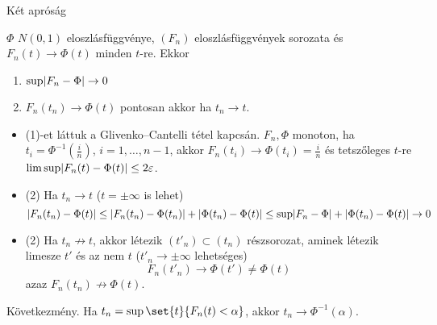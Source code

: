 \documentclass[aspectratio=169,notheorems,9pt,\option]{beamer}
\begin{document}
  \begin{frame}{Két apróság}
    \begin{proposition}
      $\Phi$ $N (0,1)$ eloszlásfüggvénye, $(F_n)$ eloszlásfüggvények
      sorozata és  $F_n (t)\to \Phi (t)$ minden $t$-re.  Ekkor
      \begin{enumerate}
      \item $\sup\abs*{F_n-\Phi}\to0$ 
      \item $F_n (t_n)\to \Phi (t)$ pontosan akkor ha $t_n\to t$.
      \end{enumerate}
    \end{proposition}
    \begin{itemize}
    \item (1)-et láttuk a  Glivenko--Cantelli
      tétel kapcsán. $F_n,\Phi$ monoton, ha $t_i=\Phi^{-1}(\frac in)$, $i=1,\dots,n-1$, akkor
      $F_n(t_i)\to\Phi(t_i)=\frac in$ és tetszőleges $t$-re $\limsup \lvert F_n(t)-\Phi(t)\rvert\leq 2\varepsilon$.
    \item (2) Ha $t_n\to t$ ($t=\pm\infty$ is lehet)
      \begin{displaymath}
        \abs*{F_n (t_n)-\Phi (t)}\leq \abs*{F_n (t_n)-\Phi (t_n)}+\abs*{\Phi(t_n)-\Phi (t)}
        \leq \sup\abs*{F_n-\Phi}+\abs*{\Phi(t_n)-\Phi (t)}\to0
      \end{displaymath}
      
    \item (2) Ha $t_n\not\to t$, akkor létezik $(t'_n)\subset (t_n)$
      részsorozat, aminek létezik limesze $t'$ és az nem $t$ ($t'_n\to\pm\infty$ lehetséges)
      \begin{displaymath}
        F_n (t'_n)\to\Phi (t')\neq\Phi (t)
      \end{displaymath}
      azaz $F_n (t_n)\not\to\Phi (t)$.
    \end{itemize}
    Következmény. Ha $t_n=\sup\set{t}{F_n (t)<\alpha}$, akkor $t_n\to\Phi^{-1} (\alpha)$.
  \end{frame}
\end{document}
